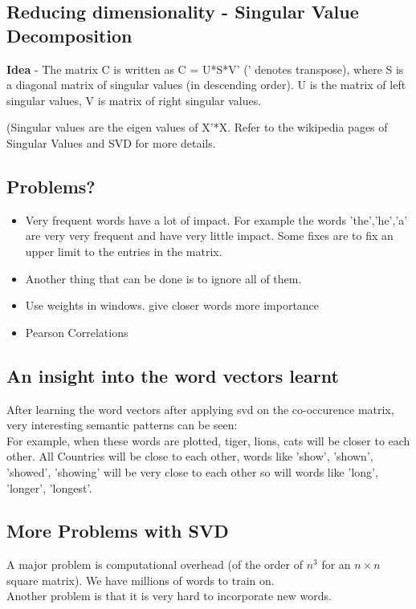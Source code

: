 \documentclass{article}
\begin{document}
\subsection{Reducing dimensionality - Singular Value Decomposition}
\textbf{Idea} - The matrix C is written as C = U*S*V' (' denotes transpose), where S is a diagonal matrix of singular values (in descending order). U is the matrix of left singular values, V is matrix of right singular values.

(Singular values are the eigen values of X'*X. Refer to the wikipedia pages of Singular Values and SVD for more details.

\subsection{Problems?}
\begin{itemize}
\item Very frequent words have a lot of impact. For example the words 'the','he','a' are very very frequent and have very little impact. Some fixes are to fix an upper limit to the entries in the matrix.
\item Another thing that can be done is to ignore all of them.
\item Use weights in windows. give closer words more importance
\item Pearson Correlations
\end{itemize}

\subsection{An insight into the word vectors learnt}
\hspace{10pt} After learning the word vectors after applying svd on the co-occurence matrix, very interesting semantic patterns can be seen:\\
For example, when these words are plotted, tiger, lions, cats will be closer to each other. All Countries will be close to each other, words like 'show', 'shown', 'showed', 'showing' will be very close to each other so will words like 'long', 'longer', 'longest'.\\

\subsection{More Problems with SVD}
A major problem is computational overhead (of the order of $n^3$ for an $n\times n$ square matrix). We have millions of words to train on.\\
Another problem is that it is very hard to incorporate new words.
\end{document}
